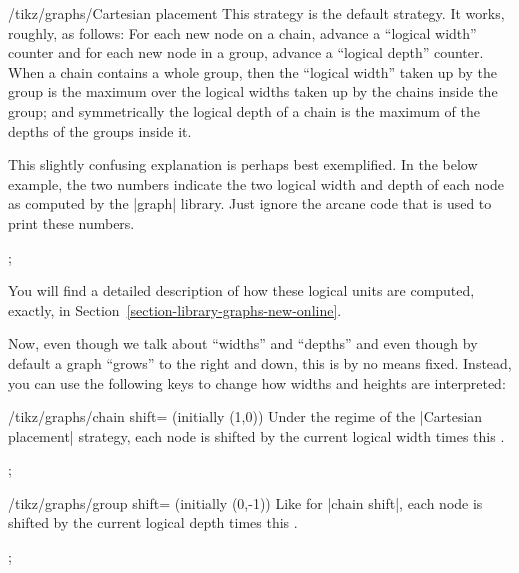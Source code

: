 \begin{key}{/tikz/graphs/Cartesian placement}
    This strategy is the default strategy. It works, roughly, as follows: For
    each new node on a chain, advance a ``logical width'' counter and for each
    new node in a group, advance a ``logical depth'' counter. When a chain
    contains a whole group, then the ``logical width'' taken up by the group is
    the maximum over the logical widths taken up by the chains inside the
    group; and symmetrically the logical depth of a chain is the maximum of the
    depths of the groups inside it.

    This slightly confusing explanation is perhaps best exemplified. In the
    below example, the two numbers indicate the two logical width and depth of
    each node as computed by the |graph| library. Just ignore the arcane code
    that is used to print these numbers.
\begin{codeexample}[]
\tikz
  ;
\end{codeexample}
    You will find a detailed description of how these logical units are
    computed, exactly, in Section~\ref{section-library-graphs-new-online}.

    Now, even though we talk about ``widths'' and ``depths'' and even though by
    default a graph ``grows'' to the right and down, this is by no means fixed.
    Instead, you can use the following keys to change how widths and heights
    are interpreted:
    \begin{key}{/tikz/graphs/chain shift= (initially {(1,0)})}
        Under the regime of the |Cartesian placement| strategy, each node is
        shifted by the current logical width times this .
\begin{codeexample}[]
\tikz {};
\end{codeexample}
    \end{key}
    \begin{key}{/tikz/graphs/group shift= (initially {(0,-1)})}
        Like for |chain shift|, each node is shifted by the current logical
        depth times this .
\begin{codeexample}[]
\tikz {};
\end{codeexample}
    \end{key}
\end{key}


